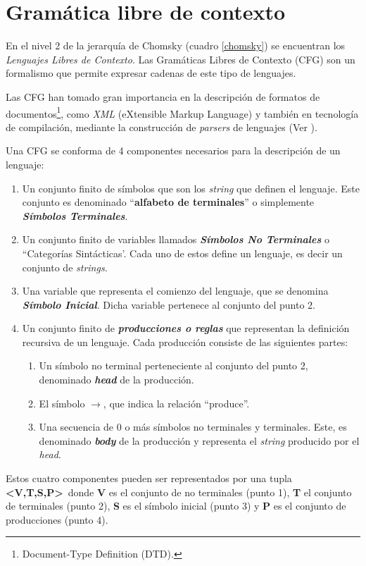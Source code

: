 \section{Gramática libre de contexto}
\label{sec:def-CFG}
En el nivel 2 de la jerarquía de Chomsky (cuadro \ref{chomsky}) se encuentran los \textit{Lenguajes Libres de Contexto}. Las Gramáticas Libres de Contexto (CFG) son un formalismo que permite expresar cadenas de este tipo de lenguajes.

Las CFG han tomado gran importancia en la descripción de formatos de documentos\footnote{Document-Type Definition (DTD).}, como \textit{XML} (eXtensible Markup Language) y también en tecnología de compilación, mediante la construcción de \textit{parsers} de lenguajes (Ver \cite{compiladores}).  

\begin{definition}
Una CFG se conforma de 4 componentes necesarios para la descripción de un lenguaje:

\begin{enumerate}
\item Un conjunto finito de símbolos que son los \textit{string} que definen el lenguaje. Este conjunto es denominado ``\textbf{alfabeto de terminales}'' o simplemente \textit{\textbf{Símbolos Terminales}}.

\item Un conjunto finito de variables llamados \textit{\textbf{Símbolos No Terminales}} o ``Categorías Sintácticas'. Cada uno de estos define un lenguaje, es decir un conjunto de \textit{strings}.

\item Una variable que representa el comienzo del lenguaje, que se denomina \textit{\textbf{Símbolo Inicial}}. Dicha variable pertenece al conjunto del punto 2.

\item Un conjunto finito de \textit{\textbf{producciones o reglas}} que representan la definición recursiva de un lenguaje. Cada producción consiste de las siguientes partes:

\begin{enumerate}
\item Un símbolo no terminal perteneciente al conjunto del punto 2, denominado \textit{\textbf{head}} de la producción.

\item El símbolo \textbf{$\rightarrow$}, que indica la relación ``produce''.

\item Una secuencia de $0$ o más símbolos no terminales y terminales. Este, es denominado \textit{\textbf{body}} de la producción y representa el \textit{string} producido por el \textit{head}.
\end{enumerate}
\end{enumerate}

Estos cuatro componentes pueden ser representados por una tupla \textbf{<V,T,S,P>}\ donde \textbf{V} es el conjunto de no terminales (punto 1), \textbf{T} el conjunto de terminales (punto 2), \textbf{S} es el símbolo inicial (punto 3) y \textbf{P} es el conjunto de producciones (punto 4).
\end{definition}

